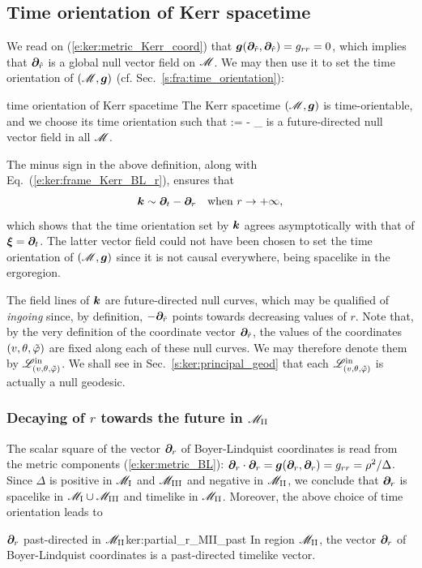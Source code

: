 \subsection{Time orientation of Kerr spacetime} \label{s:ker:time_orientation}

We read on (\ref{e:ker:metric_Kerr_coord}) that
$\bm{g}(\bm{\partial}_{\hat{r}},\bm{\partial}_{\hat{r}}) = g_{rr} = 0$, which
implies that $\bm{\partial}_{\hat{r}}$ is a global null vector field on $\mathscr{M}$.
We may then use it to set the time orientation of $(\mathscr{M},\bm{g})$ (cf. Sec.~\ref{s:fra:time_orientation}):
\begin{tprop}{time orientation of Kerr spacetime}{}
The Kerr spacetime $(\mathscr{M},\bm{g})$ is time-orientable, and we choose its time orientation
such that
\be \label{e:ker:def_k_hat_r}
     := - \wpar_{}
\ee
is a future-directed null vector field in all $\mathscr{M}$.
\end{tprop}

\begin{remark}
The minus sign
in the above definition, along with Eq.~(\ref{e:ker:frame_Kerr_BL_r}),
ensures that
\[
    \bm{k} \sim \bm{\partial}_t -  \bm{\partial}_r  \quad\mbox{when}\
            r \rightarrow +\infty ,
\]
which shows that the time orientation set by $\bm{k}$ agrees asymptotically
with that of $\bm{\xi}=\bm{\partial}_t$. The latter vector field could not have been
chosen to set the time orientation of $(\mathscr{M},\bm{g})$ since it is not
causal everywhere, being spacelike in the ergoregion.
\end{remark}

The field lines
of $\bm{k}$ are future-directed null curves,
which may be qualified of \emph{ingoing} since, by definition, $-\bm{\partial}_{\hat{r}}$ points towards
decreasing values of $r$. Note that, by the very definition of
the coordinate vector $\bm{\partial}_{\hat{r}}$,
the values of the coordinates $(v,\theta,{\tilde\varphi})$ are fixed along each of these
null curves. We may therefore denote them by $\mathscr{L}^{\rm in}_{(v,\theta,{\tilde\varphi})}$.
We shall see in Sec.~\ref{s:ker:principal_geod} that each $\mathscr{L}^{\rm in}_{(v,\theta,{\tilde\varphi})}$ is actually a null geodesic.

\subsubsection{Decaying of $r$ towards the future in $\mathscr{M}_{\rm II}$}

The scalar square of the vector $\bm{\partial}_r$ of Boyer-Lindquist coordinates
is read from the metric components (\ref{e:ker:metric_BL}):
$\bm{\partial}_r \cdot \bm{\partial}_r = \bm{g}(\bm{\partial}_r,\bm{\partial}_r) = g_{rr} = \rho^2 / \Delta$. Since $\Delta$ is
positive in $\mathscr{M}_{\rm I}$ and $\mathscr{M}_{\rm III}$ and negative in $\mathscr{M}_{\rm II}$,
we conclude that $\bm{\partial}_r$ is spacelike in $\mathscr{M}_{\rm I}\cup \mathscr{M}_{\rm III}$
and timelike in $\mathscr{M}_{\rm II}$. Moreover, the above choice of time orientation leads to
\begin{tprop}{$\bm{\partial}_r$ past-directed in $\mathscr{M}_{\rm II}$}{ker:partial_r_MII_past}
In region $\mathscr{M}_{\rm II}$, the vector $\bm{\partial}_r$ of Boyer-Lindquist coordinates
is a past-directed timelike vector.
\end{tprop}

